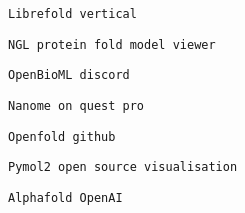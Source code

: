      

     
     
      \protect\hypertarget{ID_816778219}{}{}

\begin{verbatim}
Librefold vertical
\end{verbatim}

       
       
        \protect\hypertarget{ID_1215779429}{}{}

\begin{verbatim}
NGL protein fold model viewer
\end{verbatim}
       

       
       
        \protect\hypertarget{ID_1427566116}{}{}

\begin{verbatim}
OpenBioML discord
\end{verbatim}
       

       
       
        \protect\hypertarget{ID_598912297}{}{}

\begin{verbatim}
Nanome on quest pro
\end{verbatim}
       

       
       
        \protect\hypertarget{ID_1196634716}{}{}

\begin{verbatim}
Openfold github
\end{verbatim}
       

       
       
        \protect\hypertarget{ID_1121616713}{}{}

\begin{verbatim}
Pymol2 open source visualisation
\end{verbatim}
       

       
       
        \protect\hypertarget{ID_917809191}{}{}

\begin{verbatim}
Alphafold OpenAI
\end{verbatim}

         
         
          \protect\hypertarget{ID_530166233}{}{}

\begin{verbatim}
\end{verbatim}
         
